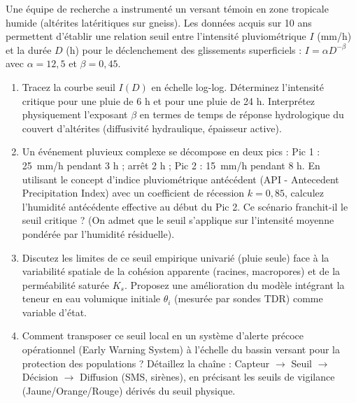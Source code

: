 \documentclass[11pt]{article}
\begin{document}
\begin{exercice}
Une équipe de recherche a instrumenté un versant témoin en zone tropicale humide (altérites latéritiques sur gneiss). Les données acquis sur 10 ans permettent d'établir une relation seuil entre l'intensité pluviométrique $I$ (mm/h) et la durée $D$ (h) pour le déclenchement des glissements superficiels : $I = \alpha D^{-\beta}$ avec $\alpha = 12,5$ et $\beta = 0,45$.

\begin{enumerate}
    \item Tracez la courbe seuil $I(D)$ en échelle log-log. Déterminez l'intensité critique pour une pluie de 6 h et pour une pluie de 24 h. Interprétez physiquement l'exposant $\beta$ en termes de temps de réponse hydrologique du couvert d'altérites (diffusivité hydraulique, épaisseur active).
    \item Un événement pluvieux complexe se décompose en deux pics : Pic 1 : \SI{25}{mm/h} pendant 3 h ; arrêt 2 h ; Pic 2 : \SI{15}{mm/h} pendant 8 h. En utilisant le concept d'indice pluviométrique antécédent (API - Antecedent Precipitation Index) avec un coefficient de récession $k=0,85$, calculez l'humidité antécédente effective au début du Pic 2. Ce scénario franchit-il le seuil critique ? (On admet que le seuil s'applique sur l'intensité moyenne pondérée par l'humidité résiduelle).
    \item Discutez les limites de ce seuil empirique univarié (pluie seule) face à la variabilité spatiale de la cohésion apparente (racines, macropores) et de la perméabilité saturée $K_s$. Proposez une amélioration du modèle intégrant la teneur en eau volumique initiale $\theta_i$ (mesurée par sondes TDR) comme variable d'état.
    \item Comment transposer ce seuil local en un système d'alerte précoce opérationnel (Early Warning System) à l'échelle du bassin versant pour la protection des populations ? Détaillez la chaîne : Capteur $\to$ Seuil $\to$ Décision $\to$ Diffusion (SMS, sirènes), en précisant les seuils de vigilance (Jaune/Orange/Rouge) dérivés du seuil physique.
\end{enumerate}
\end{exercice}
\end{document}
